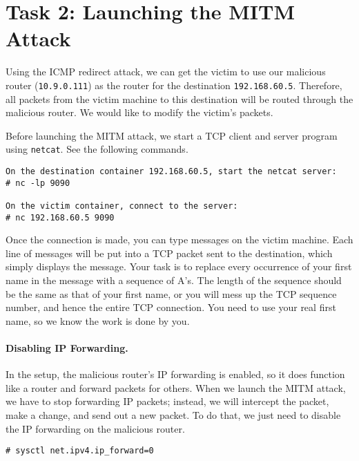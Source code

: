 \section{Task 2: Launching the MITM Attack} 

Using the ICMP redirect attack, we can get the victim to use 
our malicious router (\texttt{10.9.0.111}) as the router for the destination
\texttt{192.168.60.5}. Therefore, all packets from the victim machine 
to this destination will be routed through the malicious router.
We would like to modify the victim's packets. 


Before launching the MITM attack, we start a TCP client and server program
using \texttt{netcat}. See the following commands.  

\begin{lstlisting}
On the destination container 192.168.60.5, start the netcat server:
# nc -lp 9090

On the victim container, connect to the server:
# nc 192.168.60.5 9090
\end{lstlisting}


Once the connection is made, you can type messages on the victim machine.
Each line of messages will be put into a TCP packet sent
to the destination, which simply displays the message.
Your task is to replace every occurrence of your first name in the
message with a sequence of A's. The length of the sequence should be the
same as that of your first name, or you will mess up the TCP sequence
number, and hence the entire TCP connection. You need to use your real
first name, so we know the work is done by you.



\paragraph{Disabling IP Forwarding.}
In the setup, the malicious router's IP forwarding is enabled, so it does 
function like a router and forward packets for others. When we launch 
the MITM attack, we have to stop forwarding IP packets; instead,
we will intercept the packet, make a change, and send out a new packet. 
To do that, we just need to disable the IP forwarding on the malicious 
router. 

\begin{lstlisting}
# sysctl net.ipv4.ip_forward=0
\end{lstlisting}


